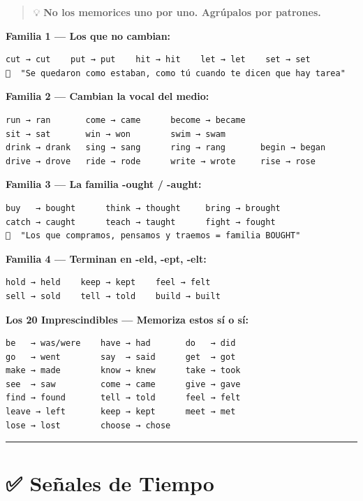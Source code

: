 \documentclass[
  spanish,
  letterpaper,
]{scrbook}
\begin{document}
\begin{quote}
💡 \textbf{No los memorices uno por uno. Agrúpalos por patrones.}
\end{quote}

\textbf{Familia 1 --- Los que no cambian:}

\begin{verbatim}
cut → cut    put → put    hit → hit    let → let    set → set
🧠  "Se quedaron como estaban, como tú cuando te dicen que hay tarea"
\end{verbatim}

\textbf{Familia 2 --- Cambian la vocal del medio:}

\begin{verbatim}
run → ran       come → came      become → became
sit → sat       win → won        swim → swam
drink → drank   sing → sang      ring → rang       begin → began
drive → drove   ride → rode      write → wrote     rise → rose
\end{verbatim}

\textbf{Familia 3 --- La familia -ought / -aught:}

\begin{verbatim}
buy   → bought      think → thought     bring → brought
catch → caught      teach → taught      fight → fought
🧠  "Los que compramos, pensamos y traemos = familia BOUGHT"
\end{verbatim}

\textbf{Familia 4 --- Terminan en -eld, -ept, -elt:}

\begin{verbatim}
hold → held    keep → kept    feel → felt
sell → sold    tell → told    build → built
\end{verbatim}

\textbf{Los 20 Imprescindibles --- Memoriza estos sí o sí:}

\begin{verbatim}
be   → was/were    have → had       do   → did
go   → went        say  → said      get  → got
make → made        know → knew      take → took
see  → saw         come → came      give → gave
find → found       tell → told      feel → felt
leave → left       keep → kept      meet → met
lose → lost        choose → chose
\end{verbatim}

\begin{center}\rule{0.5\linewidth}{0.5pt}\end{center}

\section{✅ Señales de Tiempo}\label{seuxf1ales-de-tiempo-1}
\end{document}
